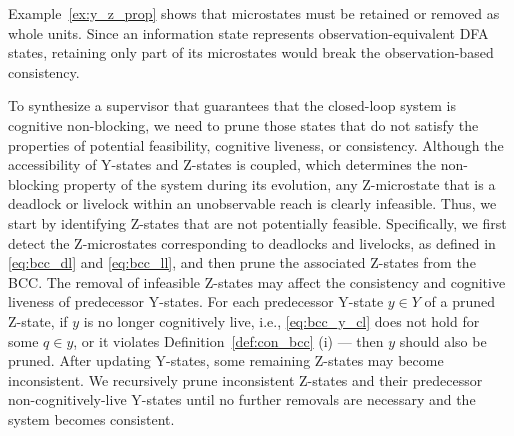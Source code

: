 \documentclass[journal,twoside,web]{ieeecolor}
\begin{document}
%
Example~\ref{ex:y_z_prop} shows that microstates must be retained or removed as whole units. 
Since an information state represents observation-equivalent DFA states, retaining only part of its microstates would break the observation-based consistency. 

%
%
%
To synthesize a supervisor that guarantees that the closed-loop system is cognitive non-blocking, we need to prune those states that do not satisfy the properties of potential feasibility, cognitive liveness, or consistency.
%
Although the accessibility of Y-states and Z-states is coupled, which determines the non-blocking property of the system during its evolution, 
any Z-microstate that is a deadlock or livelock within an unobservable reach is clearly infeasible. 
Thus, we start by identifying Z-states that are not potentially feasible. 
Specifically, we first detect the Z-microstates corresponding to deadlocks and livelocks, as defined in \eqref{eq:bcc_dl} and \eqref{eq:bcc_ll}, and then prune the associated Z-states from the BCC.
%
The removal of infeasible Z-states may affect the consistency and cognitive liveness of predecessor Y-states. 
For each predecessor Y-state $y \in Y$ of a pruned Z-state, 
if $y$ is no longer cognitively live, i.e., \eqref{eq:bcc_y_cl} does not hold for some $q \in y$, or it violates Definition~\ref{def:con_bcc} (i) — then $y$ should also be pruned.
%
After updating Y-states, some remaining Z-states may become inconsistent. 
We recursively prune inconsistent Z-states and their predecessor non-cognitively-live Y-states until no further removals are necessary and the system becomes consistent. 
\end{document}
